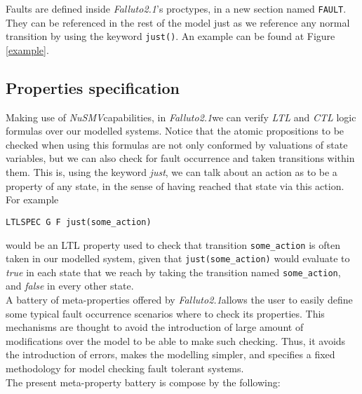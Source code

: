 \documentclass[12pt]{article}
\newcommand{\nusmv}{\mbox{\textit{NuSMV}}}
\newcommand{\falluto}{\mbox{\textit{Falluto2.1}}}
\begin{document}
Faults are defined inside \falluto's proctypes, in a new section named \texttt{FAULT}. They can be referenced in the rest of the model just as we reference any normal transition by using the keyword \texttt{just()}. An example can be found at Figure \ref{example}.

\subsection{Properties specification}
Making use of \nusmv capabilities, in \falluto we can verify \textit{LTL} and \textit{CTL} logic formulas over our modelled systems. Notice that the atomic propositions to be checked when using this formulas are not only conformed by valuations of state variables, but we can also check for fault occurrence and taken transitions within them. This is, using the keyword \textit{just}, we can talk about an action as to be a property of any state, in the sense of having reached that state via this action. For example
\begin{center}
\texttt{LTLSPEC G F just(some\_action)}
\end{center}
would be an LTL property used to check that transition \texttt{some\_action} is often taken in our modelled system, given that \texttt{just(some\_action)} would evaluate to \textit{true} in each state that we reach by taking the transition named \texttt{some\_action}, and \textit{false} in every other state.\\
A battery of meta-properties offered by \falluto allows the user to easily define some typical fault occurrence scenarios where to check its properties. This mechanisms are thought to avoid the introduction of large amount of modifications over the model to be able to make such checking. Thus, it avoids the introduction of errors, makes the modelling simpler, and specifies a fixed methodology for model checking fault tolerant systems.\\
The present meta-property battery is compose by the following:
\end{document}
